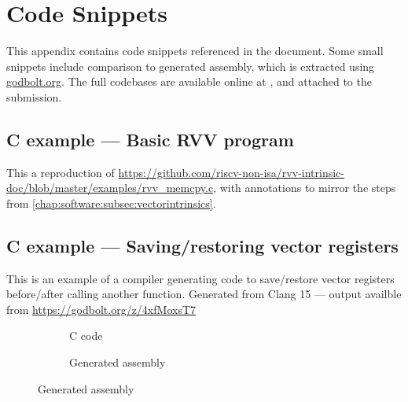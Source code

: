 \chapter{Code Snippets}
This appendix contains code snippets referenced in the document.
Some small snippets include comparison to generated assembly, which is extracted using \url{godbolt.org}.
The full codebases are available online at , and attached to the submission.


\clearpage
\pagebreak
\section{C example --- Basic RVV program}\label{example:rvv}
This a reproduction of \url{https://github.com/riscv-non-isa/rvv-intrinsic-doc/blob/master/examples/rvv_memcpy.c}, with annotations to mirror the steps from \cref{chap:software:subsec:vectorintrinsics}.

\clearpage
\pagebreak
\section{C example --- Saving/restoring vector registers}
This is an example of a compiler generating code to save/restore vector registers before/after calling another function.
Generated from Clang 15 --- output availble from \url{https://godbolt.org/z/4xfMoxsT7}
\vspace{-2em}
\begin{figure}[h]
    \caption{Saving/restoring vector registers}\label{example:saverestore}

    \centering
    \begin{subfigure}[t]{0.45\linewidth}
        \caption{C code}
    \end{subfigure}\hfill
    \begin{subfigure}[t]{0.55\linewidth}
        \caption{Generated assembly}
    \end{subfigure}
\end{figure}
\clearpage

